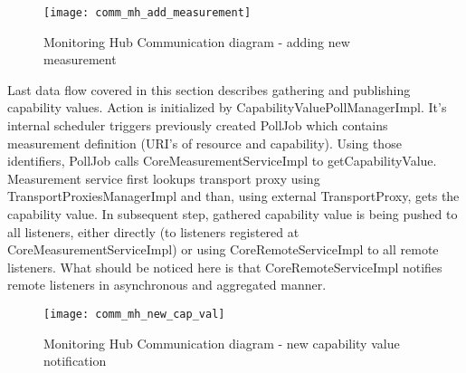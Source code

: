 \begin{figure}[h]
  \centering
  \texttt{[image: comm\_mh\_add\_measurement]}
  \caption{Monitoring Hub Communication diagram - adding new measurement}
  \label{fig:comm_mh_add_measurement}
\end{figure}

Last data flow covered in this section describes gathering and publishing capability values. Action is initialized by
CapabilityValuePollManagerImpl. It's internal scheduler triggers previously created PollJob which contains measurement
definition (URI's of resource and capability). Using those identifiers, PollJob calls CoreMeasurementServiceImpl to
getCapabilityValue. Measurement service first lookups transport proxy using TransportProxiesManagerImpl and than, using
external TransportProxy, gets the capability value. In subsequent step, gathered capability value is being pushed to all
listeners, either directly (to listeners registered at CoreMeasurementServiceImpl) or using CoreRemoteServiceImpl to all
remote listeners. What should be noticed here is that CoreRemoteServiceImpl notifies remote listeners in asynchronous
and aggregated manner.

\begin{figure}[h]
  \centering
  \texttt{[image: comm\_mh\_new\_cap\_val]}
  \caption{Monitoring Hub Communication diagram - new capability value notification}
  \label{fig:comm_new_cap_val}
\end{figure}

\pagebreak